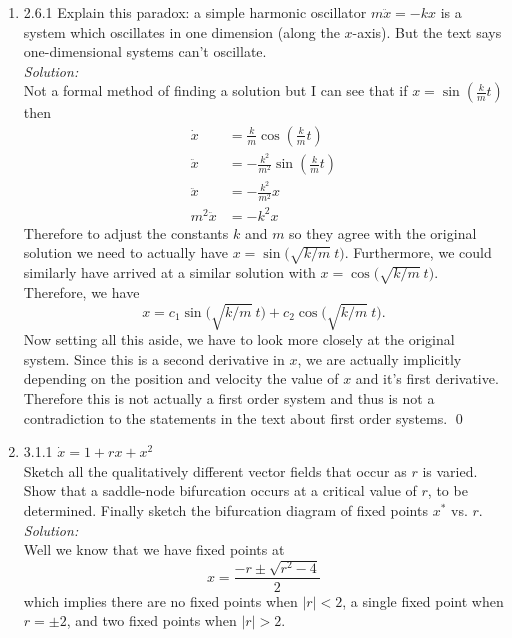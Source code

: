 \documentclass[10pt]{amsart}
\theoremstyle{nonumberplain}
\begin{document}
\begin{enumerate}[label={\bf {\arabic*}:}]
\item 2.6.1 Explain this paradox: a simple harmonic oscillator $m\ddot {x} = -k x$ is a system which oscillates in one dimension (along the $x$-axis). But the text says one-dimensional systems can't oscillate. \\

\noindent
\textit{Solution:} \\
Not a formal method of finding a solution but I can see that if $x = \sin \left(  \frac k m t \right)$ then
\begin{align*}
\dot x &= \frac k m \cos \left(  \frac k m t \right) \\
\ddot x &= - \frac {k^2} {m^2} \sin \left(  \frac k m t \right) \\
\ddot x &= - \frac {k^2} {m^2} x \\
m^2\ddot x &= - k^2 x
\end{align*}
Therefore to adjust the constants $k$ and $m$ so they agree with the original solution we need to actually have $x = \sin \big(  \sqrt {k/m} \: t \big)$.
Furthermore, we could similarly have arrived at a similar solution with $x = \cos \big(  \sqrt {k/m} \: t \big)$.
Therefore, we have
$$x = c_1 \sin \big(  \sqrt {k/m} \: t \big) + c_2 \cos \big(  \sqrt {k/m} \: t \big).$$
Now setting all this aside, we have to look more closely at the original system.
Since this is a second derivative in $x$, we are actually implicitly depending on the position and velocity the value of $x$ and it's first derivative.
Therefore this is not actually a first order system and thus is not a contradiction to the statements in the text about first order systems.
\qed \\

\newpage

\item 3.1.1 $\dot x = 1 + rx + x^2$ \\
Sketch all the qualitatively different vector fields that occur as $r$ is varied.
Show that a saddle-node bifurcation occurs at a critical value of $r$, to be determined.
Finally sketch the bifurcation diagram of fixed points $x^*$ vs. $r$. \\

\noindent
\textit{Solution:} \\
Well we know that we have fixed points at
$$x = \frac {-r \pm \sqrt {r^2 - 4}}{2}$$
which implies there are no fixed points when $|r| < 2$, a single fixed point when $r = \pm 2$, and two fixed points when $|r| > 2$.


\end{enumerate}
\end{document}
